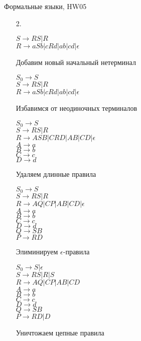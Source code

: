 \documentclass[12pt]{article}
\begin{document}
\begin{center} {\LARGE Формальные языки, HW05} \end{center}

\bigskip

\begin{enumerate}
\item[2.] \begin{myquote}
$S \to RS|R$\\
$R \to aSb|cRd|ab|cd|\epsilon$
\end{myquote}
Добавим новый начальный нетерминал
 \begin{myquote}
$S_0 \to S$\\
$S \to RS|R$\\
$R \to aSb|cRd|ab|cd|\epsilon$
\end{myquote}
Избавимся от неодиночных терминалов
\begin{myquote}
$S_0 \to S$\\
$S \to RS|R$\\
$R \to ASB|CRD|AB|CD|\epsilon$\\
$A \to a$\\
$B \to b$\\
$C \to c$\\
$D \to d$
\end{myquote}
Удаляем длинные правила
\begin{myquote}
$S_0 \to S$\\
$S \to RS|R$\\
$R \to AQ|CP|AB|CD|\epsilon$\\
$A \to a$\\
$B \to b$\\
$C \to c$\\
$D \to d$\\
$Q \to SB$\\
$P \to RD$
\end{myquote}
Элиминируем $\epsilon$-правила
\begin{myquote}
$S_0 \to S|\epsilon$\\
$S \to RS|R|S$\\
$R \to AQ|CP|AB|CD$\\
$A \to a$\\
$B \to b$\\
$C \to c$\\
$D \to d$\\
$Q \to SB$\\
$P \to RD|D$
\end{myquote}
Уничтожаем цепные правила\\
\begin{myquote}

\end{myquote}
\end{enumerate}
\end{document}
